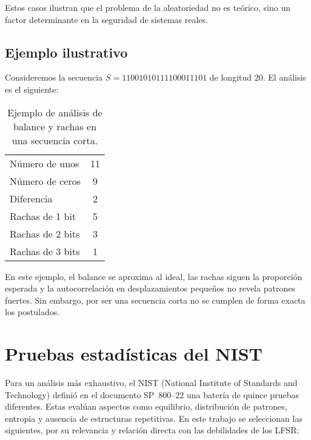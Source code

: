 Estos casos ilustran que el problema de la aleatoriedad no es teórico, sino un
factor determinante en la seguridad de sistemas reales.

\subsection*{Ejemplo ilustrativo}

Consideremos la secuencia $S = 11001010111100011101$ de longitud $20$. El
análisis es el siguiente:

\begin{table}[h]
\centering
\begin{tabular}{l|c}
Número de unos & 11 \\
Número de ceros & 9 \\
Diferencia & 2 \\
Rachas de 1 bit & 5 \\
Rachas de 2 bits & 3 \\
Rachas de 3 bits & 1 \\
\end{tabular}
\caption{Ejemplo de análisis de balance y rachas en una secuencia corta.}
\end{table}

En este ejemplo, el balance se aproxima al ideal, las rachas siguen la
proporción esperada y la autocorrelación en desplazamientos pequeños no revela
patrones fuertes. Sin embargo, por ser una secuencia corta no se cumplen de
forma exacta los postulados.

\section*{Pruebas estadísticas del NIST}

Para un análisis más exhaustivo, el NIST (National Institute of Standards and
Technology) definió en el documento SP~800--22 una batería de quince pruebas
diferentes. Estas evalúan aspectos como equilibrio, distribución de patrones,
entropía y ausencia de estructuras repetitivas. En este trabajo se seleccionan
las siguientes, por su relevancia y relación directa con las debilidades de los
LFSR:

